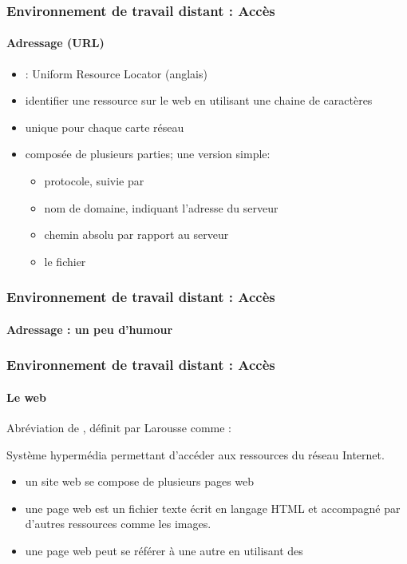 \documentclass[xcolor=table]{beamer}
\begin{document}
\begin{frame}
\frametitle{Environnement de travail distant : Accès}
\framesubtitle{Adressage (URL)}

\begin{itemize}
	\item {} : Uniform Resource Locator (anglais)
	\item identifier une ressource sur le web en utilisant une chaine de caractères
	\item unique pour chaque carte réseau  
	\item composée de plusieurs parties; une version simple: 
	\begin{itemize}
		\item protocole, suivie par \keyword{://}
		\item nom de domaine, indiquant l'adresse du serveur
		\item chemin absolu par rapport au serveur 
		\item le fichier 
	\end{itemize}
\end{itemize}


\end{frame}

\begin{frame}
\frametitle{Environnement de travail distant : Accès}
\framesubtitle{Adressage : un peu d'humour}

\begin{center}
\end{center}


\end{frame}

%
%
%
%


\begin{frame}
\frametitle{Environnement de travail distant : Accès}
\framesubtitle{Le web}

Abréviation de , définit par Larousse comme :
\begin{definition}
	Système hypermédia permettant d'accéder aux ressources du réseau Internet.
\end{definition}

\begin{itemize}
	\item un site web se compose de plusieurs pages web
	\item une page web est un fichier texte écrit en langage HTML et accompagné par d'autres ressources comme les images. 
	\item une page web peut se référer à une autre en utilisant des  
\end{itemize}

\end{frame}
\end{document}
